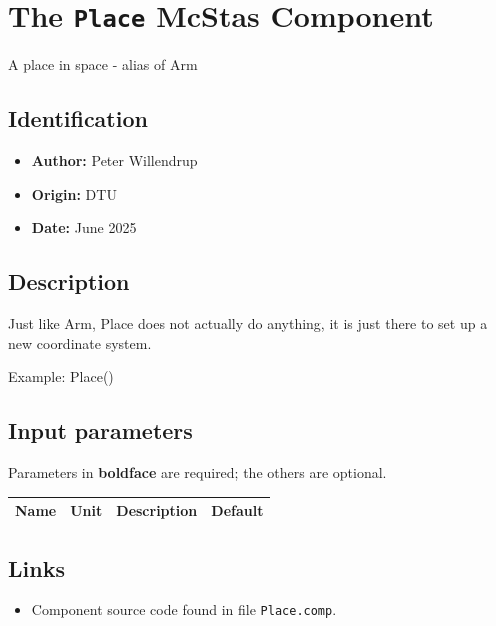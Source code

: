 \section{The \texttt{Place} McStas Component}
A place in space - alias of Arm

\subsection*{Identification}
\begin{itemize}
  \item \textbf{Author:} Peter Willendrup
  \item \textbf{Origin:} DTU
  \item \textbf{Date:} June 2025
\end{itemize}

\subsection*{Description}
Just like Arm, Place does not actually do anything, it is just there to set up a new coordinate system.

Example: Place()

\subsection*{Input parameters}
Parameters in \textbf{boldface} are required; the others are optional.

\begin{longtable}{p{}p{}p{}p{}}
\toprule
\textbf{Name} & \textbf{Unit} & \textbf{Description} & \textbf{Default} \\
\midrule
\endhead
\bottomrule
\end{longtable}

\subsection*{Links}
\begin{itemize}
  \item Component source code found in file \texttt{Place.comp}.
\end{itemize}
